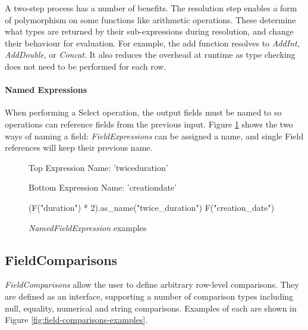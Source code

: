 A two-step process has a number of benefits. The resolution step enables a form of polymorphism on some functions like arithmetic operations. These determine what types are returned by their sub-expressions during resolution, and change their behaviour for evaluation. For example, the add function resolves to \textit{AddInt}, \textit{AddDouble}, or \textit{Concat}. It also reduces the overhead at runtime as type checking does not need to be performed for each row.

\paragraph{Named Expressions}
When performing a Select operation, the output fields must be named to so operations can reference fields from the previous input. Figure \ref{fig:namedfieldexpression-examples} shows the two ways of naming a field: \textit{FieldExpressions} can be assigned a name, and single Field references will keep their previous name.

\begin{figure}[htp]
	Top Expression Name: 'twice\textunderscore duration'
	
	Bottom Expression Name: 'creation\textunderscore date'
	\begin{python}
(F("duration") * 2).as_name("twice_duration")
F("creation_date")
	\end{python}
	\caption{\textit{NamedFieldExpression} examples}
	\label{fig:namedfieldexpression-examples}
\end{figure}

\subsection{FieldComparisons}\label{subsec:fieldcomparisons}
\textit{FieldComparisons} allow the user to define arbitrary row-level comparisons. They are defined as an interface, supporting a number of comparison types including null, equality, numerical and string comparisons. Examples of each are shown in Figure \ref{fig:field-comparisons-examples}.

